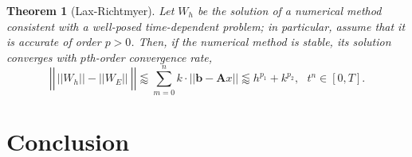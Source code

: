 \documentclass[12pt]{article}
\newtheorem{theorem}{Theorem}
\begin{document}
\begin{theorem}[Lax-Richtmyer]
	Let $W_h$ be the solution of a numerical method consistent with a well-posed time-dependent problem; in particular, assume that it is accurate of order $p>0$. Then, if the numerical method is stable, its solution converges with $p$th-order convergence rate,
	$$\left|\left|\frac{}{}||W_h|| - ||W_E||~\right|\right| \lessapprox \sum_{m=0}^n k\cdot ||\textbf{b}-\textbf{A}x|| \lessapprox h^{p_1} + k^{p_2}, ~~~t^n\in[0,T].$$
\end{theorem}

\section{Conclusion}
\end{document}
